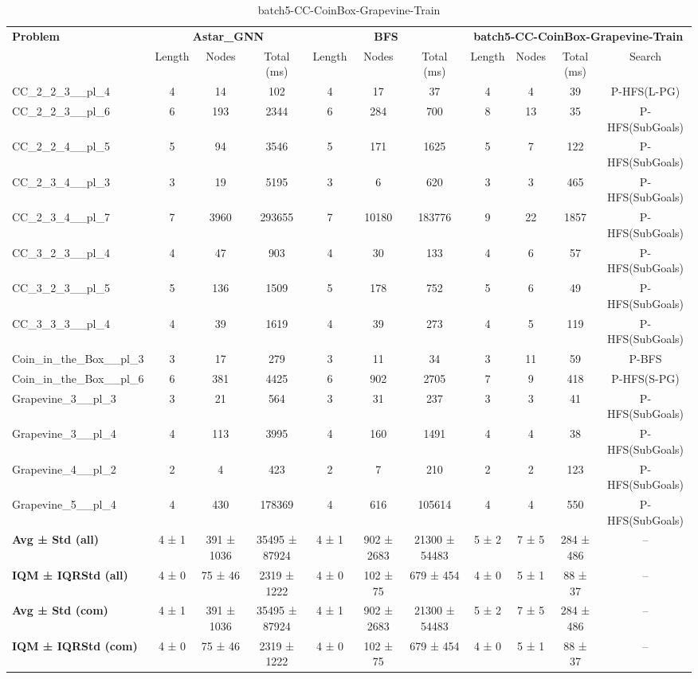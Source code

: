 \begin{table}[!ht]
\centering
\scriptsize
\begin{tabular}{l|ccc|ccc|cccc}
\multirow{2}{*}{\textbf{Problem}} & \multicolumn{3}{c|}{\textbf{Astar\_GNN}} & \multicolumn{3}{c|}{\textbf{BFS}} & \multicolumn{4}{c}{\textbf{batch5-CC-CoinBox-Grapevine-Train}} \\
\cline{2-11}
& Length & Nodes & Total (ms) & Length & Nodes & Total (ms) & Length & Nodes & Total (ms) & Search \\
\hline
CC\_2\_2\_3\_\_pl\_4 & 4 & 14 & 102 & 4 & 17 & 37 & 4 & 4 & 39 & P-HFS(L-PG) \\
CC\_2\_2\_3\_\_pl\_6 & 6 & 193 & 2344 & 6 & 284 & 700 & 8 & 13 & 35 & P-HFS(SubGoals) \\
CC\_2\_2\_4\_\_pl\_5 & 5 & 94 & 3546 & 5 & 171 & 1625 & 5 & 7 & 122 & P-HFS(SubGoals) \\
CC\_2\_3\_4\_\_pl\_3 & 3 & 19 & 5195 & 3 & 6 & 620 & 3 & 3 & 465 & P-HFS(SubGoals) \\
CC\_2\_3\_4\_\_pl\_7 & 7 & 3960 & 293655 & 7 & 10180 & 183776 & 9 & 22 & 1857 & P-HFS(SubGoals) \\
CC\_3\_2\_3\_\_pl\_4 & 4 & 47 & 903 & 4 & 30 & 133 & 4 & 6 & 57 & P-HFS(SubGoals) \\
CC\_3\_2\_3\_\_pl\_5 & 5 & 136 & 1509 & 5 & 178 & 752 & 5 & 6 & 49 & P-HFS(SubGoals) \\
CC\_3\_3\_3\_\_pl\_4 & 4 & 39 & 1619 & 4 & 39 & 273 & 4 & 5 & 119 & P-HFS(SubGoals) \\
Coin\_in\_the\_Box\_\_pl\_3 & 3 & 17 & 279 & 3 & 11 & 34 & 3 & 11 & 59 & P-BFS \\
Coin\_in\_the\_Box\_\_pl\_6 & 6 & 381 & 4425 & 6 & 902 & 2705 & 7 & 9 & 418 & P-HFS(S-PG) \\
Grapevine\_3\_\_pl\_3 & 3 & 21 & 564 & 3 & 31 & 237 & 3 & 3 & 41 & P-HFS(SubGoals) \\
Grapevine\_3\_\_pl\_4 & 4 & 113 & 3995 & 4 & 160 & 1491 & 4 & 4 & 38 & P-HFS(SubGoals) \\
Grapevine\_4\_\_pl\_2 & 2 & 4 & 423 & 2 & 7 & 210 & 2 & 2 & 123 & P-HFS(SubGoals) \\
Grapevine\_5\_\_pl\_4 & 4 & 430 & 178369 & 4 & 616 & 105614 & 4 & 4 & 550 & P-HFS(SubGoals) \\
\hline
\textbf{Avg ± Std (all)} & 4 ± 1 & 391 ± 1036 & 35495 ± 87924 & 4 ± 1 & 902 ± 2683 & 21300 ± 54483 & 5 ± 2 & 7 ± 5 & 284 ± 486 & -- \\
\textbf{IQM ± IQRStd (all)} & 4 ± 0 & 75 ± 46 & 2319 ± 1222 & 4 ± 0 & 102 ± 75 & 679 ± 454 & 4 ± 0 & 5 ± 1 & 88 ± 37 & -- \\
\textbf{Avg ± Std (com)} & 4 ± 1 & 391 ± 1036 & 35495 ± 87924 & 4 ± 1 & 902 ± 2683 & 21300 ± 54483 & 5 ± 2 & 7 ± 5 & 284 ± 486 & -- \\
\textbf{IQM ± IQRStd (com)} & 4 ± 0 & 75 ± 46 & 2319 ± 1222 & 4 ± 0 & 102 ± 75 & 679 ± 454 & 4 ± 0 & 5 ± 1 & 88 ± 37 & -- \\
\end{tabular}
\caption{batch5-CC-CoinBox-Grapevine-Train}
\label{tab:batch5_CC-CoinBox-Grapevine_comparison_train}
\end{table}
